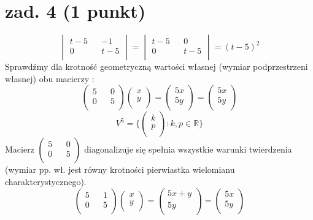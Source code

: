 \documentclass{article}
\begin{document}
\section{zad. 4 (1 punkt)}
$$
\begin{vmatrix}
t-5 && -1\\
0 && t-5\\
\end{vmatrix}=
\begin{vmatrix}
t-5 && 0\\
0 && t-5\\
\end{vmatrix}
= (t-5)^2
$$
Sprawdźmy dla krotność geometryczną wartości własnej (wymiar podprzestrzeni własnej) obu macierzy :
$$
\begin{pmatrix}
5 && 0\\
0 && 5\\
\end{pmatrix}
\begin{pmatrix}
x\\
y\\
\end{pmatrix} =
\begin{pmatrix}
5x\\
5y\\
\end{pmatrix} = 
\begin{pmatrix}
5x\\
5y\\
\end{pmatrix}
$$
$$
V^5 = \{\begin{pmatrix}
k\\
p\\
\end{pmatrix} : k,p \in \mathbb{R}\}
$$
Macierz $\begin{pmatrix}
5 && 0\\
0 && 5\\
\end{pmatrix}$ diagonalizuje się spełnia wszystkie warunki twierdzenia (wymiar pp. wł. jest równy krotności pierwiastka wielomianu charakterystycznego).
$$
\begin{pmatrix}
5 && 1\\
0 && 5\\
\end{pmatrix}
\begin{pmatrix}
x\\
y\\
\end{pmatrix} =
\begin{pmatrix}
5x + y\\
5y\\
\end{pmatrix} = 
\begin{pmatrix}
5x\\
5y\\
\end{pmatrix}
$$
\end{document}

